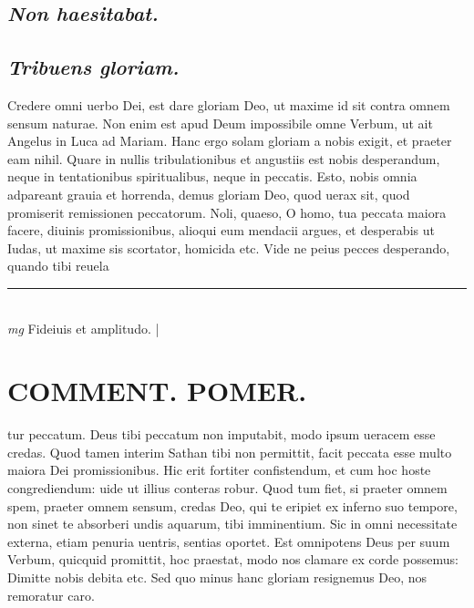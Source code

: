 \documentclass{article}
\begin{document}
\begin{pages}
\subsection*{\textit{Non haesitabat.  }}
{}
\subsection*{\textit{Tribuens gloriam. }}\pstart Credere omni uerbo Dei, est dare gloriam Deo, ut maxime id sit contra omnem sensum naturae. Non enim est apud Deum impossibile omne Verbum, ut ait Angelus in Luca ad Mariam. Hanc ergo solam gloriam a nobis exigit, et praeter eam nihil. Quare in nullis tribulationibus et angustiis est nobis desperandum, neque in tentationibus spiritualibus, neque in peccatis. Esto, nobis omnia adpareant grauia et horrenda, demus gloriam Deo, quod uerax sit, quod promiserit remissionen peccatorum. Noli, quaeso, O homo, tua peccata maiora facere, diuinis promissionibus, alioqui eum mendacii argues, et desperabis ut Iudas, ut maxime sis scortator, homicida etc. Vide ne peius pecces desperando, quando tibi reuela\pend
\vspace{0.5cm}\noindent
\vspace{0.2cm}\rule{1cm}{0.2pt}\\ 
\hspace{0.2cm}\textit{mg}
\footnotesize Fideiuis et amplitudo.  
\normalsize| 
\section*{COMMENT. POMER.  }\pstart tur peccatum. Deus tibi peccatum non imputabit, modo ipsum ueracem esse credas. Quod tamen interim Sathan tibi non permittit, facit peccata esse multo maiora Dei promissionibus. Hic erit fortiter confistendum, et cum hoc hoste congrediendum: uide ut illius conteras robur. Quod tum fiet, si praeter omnem spem, praeter omnem sensum, credas Deo, qui te eripiet ex inferno suo tempore, non sinet te absorberi undis aquarum, tibi imminentium. Sic in omni necessitate externa, etiam penuria uentris, sentias oportet. Est omnipotens Deus per suum Verbum, quicquid promittit, hoc praestat, modo nos clamare ex corde possemus: Dimitte nobis debita etc. Sed quo minus hanc gloriam resignemus Deo, nos remoratur caro.   \pend
{}
{}

\end{pages}
\end{document}
